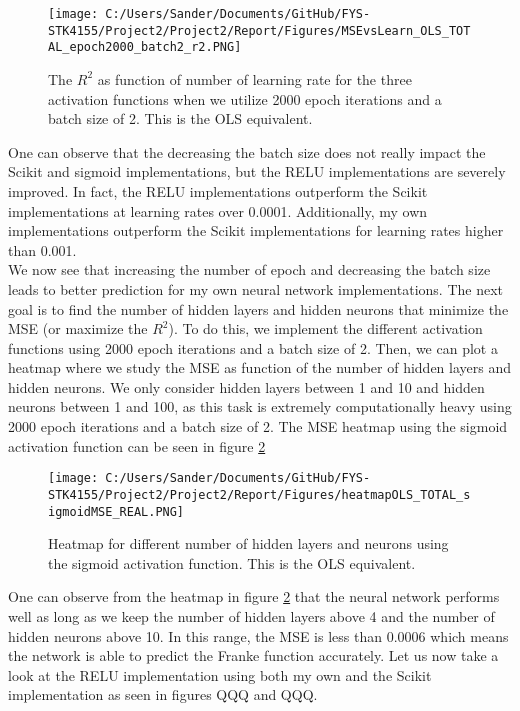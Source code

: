 \documentclass[12pt,a4paper]{article}
\begin{document}
\begin{figure}[H]
\centering
\texttt{[image: C:/Users/Sander/Documents/GitHub/FYS-STK4155/Project2/Project2/Report/Figures/MSEvsLearn\_OLS\_TOTAL\_epoch2000\_batch2\_r2.PNG]}
\caption{\label{fig:MSEvsLrateTOTAL8} The $R^2$ as function of number of learning rate for the three activation functions when we utilize 2000 epoch iterations and a batch size of 2. This is the OLS equivalent.}
\end{figure}

\noindent One can observe that the decreasing the batch size does not really impact the Scikit and sigmoid implementations, but the RELU implementations are severely improved. In fact, the RELU implementations outperform the Scikit implementations at learning rates over 0.0001. Additionally, my own implementations outperform the Scikit implementations for learning rates higher than 0.001.
\\
We now see that increasing the number of epoch and decreasing the batch size leads to better prediction for my own neural network implementations. The next goal is to find the number of hidden layers and hidden neurons that minimize the MSE (or maximize the $R^2$). To do this, we implement the different activation functions using 2000 epoch iterations and a batch size of 2. Then, we can plot a heatmap where we study the MSE as function of the number of hidden layers and hidden neurons. We only consider hidden layers between 1 and 10 and hidden neurons between 1 and 100, as this task is extremely computationally heavy using 2000 epoch iterations and a batch size of 2. The MSE heatmap using the sigmoid activation function can be seen in figure \ref{fig:heatmap1}

\begin{figure}[H]
\centering
\texttt{[image: C:/Users/Sander/Documents/GitHub/FYS-STK4155/Project2/Project2/Report/Figures/heatmapOLS\_TOTAL\_sigmoidMSE\_REAL.PNG]}
\caption{\label{fig:heatmap1} Heatmap for different number of hidden layers and neurons using the sigmoid activation function. This is the OLS equivalent.}
\end{figure}

\noindent One can observe from the heatmap in figure \ref{fig:heatmap1} that the neural network performs well as long as we keep the number of hidden layers above 4 and the number of hidden neurons above 10. In this range, the MSE is less than $0.0006$ which means the network is able to predict the Franke function accurately. Let us now take a look at the RELU implementation using both my own and the Scikit implementation as seen in figures QQQ and QQQ.
\end{document}

